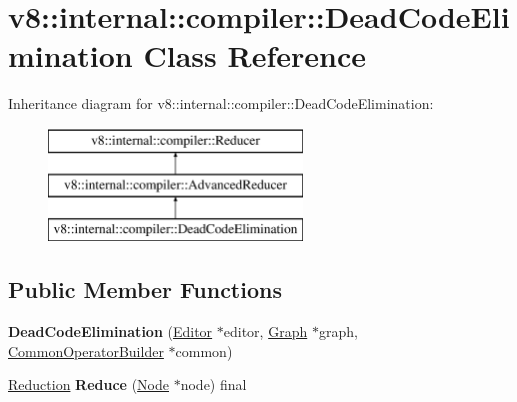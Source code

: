 \hypertarget{classv8_1_1internal_1_1compiler_1_1_dead_code_elimination}{}\section{v8\+:\+:internal\+:\+:compiler\+:\+:Dead\+Code\+Elimination Class Reference}
\label{classv8_1_1internal_1_1compiler_1_1_dead_code_elimination}
Inheritance diagram for v8\+:\+:internal\+:\+:compiler\+:\+:Dead\+Code\+Elimination\+:\begin{figure}[H]
\begin{center}
\leavevmode
\includegraphics[height=3.000000cm]{classv8_1_1internal_1_1compiler_1_1_dead_code_elimination}
\end{center}
\end{figure}
\subsection*{Public Member Functions}
\begin{DoxyCompactItemize}
\item 
{\bfseries Dead\+Code\+Elimination} (\hyperlink{classv8_1_1internal_1_1compiler_1_1_advanced_reducer_1_1_editor}{Editor} $\ast$editor, \hyperlink{classv8_1_1internal_1_1compiler_1_1_graph}{Graph} $\ast$graph, \hyperlink{classv8_1_1internal_1_1compiler_1_1_common_operator_builder}{Common\+Operator\+Builder} $\ast$common)\hypertarget{classv8_1_1internal_1_1compiler_1_1_dead_code_elimination_ae4b98cf4296f53d5fb0cdc2a43e8a540}{}\label{classv8_1_1internal_1_1compiler_1_1_dead_code_elimination_ae4b98cf4296f53d5fb0cdc2a43e8a540}

\item 
\hyperlink{classv8_1_1internal_1_1compiler_1_1_reduction}{Reduction} {\bfseries Reduce} (\hyperlink{classv8_1_1internal_1_1compiler_1_1_node}{Node} $\ast$node) final\hypertarget{classv8_1_1internal_1_1compiler_1_1_dead_code_elimination_ad618e11ccaa5186dfc88dc0aa8fedc7a}{}\label{classv8_1_1internal_1_1compiler_1_1_dead_code_elimination_ad618e11ccaa5186dfc88dc0aa8fedc7a}

\end{DoxyCompactItemize}
